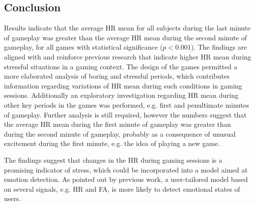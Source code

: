 
\subsection{Conclusion}

Results indicate that the average HR mean for all subjects during the last minute of gameplay was greater than the average HR mean during the second minute of gameplay, for all games with statistical significance ($p<0.001$). The findings are aligned with and reinforce previous research that indicate higher HR mean during stressful situations in a gaming context. The design of the games permitted a more elaborated analysis of boring and stressful periods, which contributes information regarding variations of HR mean during such conditions in gaming sessions. Additionally an exploratory investigation regarding HR mean during other key periods in the games was performed, e.g. first and penultimate minutes of gameplay. Further analysis is still required, however the numbers suggest that the average HR mean during the first minute of gameplay was greater than during the second minute of gameplay, probably as a consequence of unusual excitement during the first minute, e.g. the idea of playing a new game.

The findings suggest that changes in the HR during gaming sessions is a promising indicator of stress, which could be incorporated into a model aimed at emotion detection. As pointed out by previous work, a user-tailored model based on several signals, e.g. HR and FA, is more likely to detect emotional states of users.
